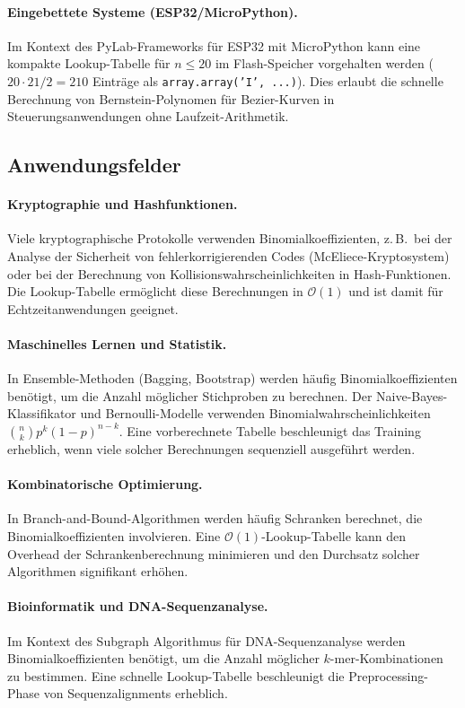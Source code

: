 ﻿\documentclass[12pt, a4paper]{article}
\newcommand{\Oh}{\mathcal{O}}
\theoremstyle{plain}
\theoremstyle{definition}
\theoremstyle{remark}
\renewcommand{\Oh}{\mathcal{O}}
\begin{document}
\paragraph{Eingebettete Systeme (ESP32/MicroPython).}
Im Kontext des PyLab-Frameworks \cite{epp2026pylab} für ESP32 mit
MicroPython kann eine kompakte Lookup-Tabelle für $n \le 20$ im
Flash-Speicher vorgehalten werden ($20 \cdot 21 / 2 = 210$ Einträge
als \texttt{array.array('I', ...)}). Dies erlaubt die schnelle
Berechnung von Bernstein-Polynomen für Bezier-Kurven in
Steuerungsanwendungen ohne Laufzeit-Arithmetik.

\subsection{Anwendungsfelder}

\paragraph{Kryptographie und Hashfunktionen.}
Viele kryptographische Protokolle verwenden Binomialkoeffizienten,
z.\,B.\ bei der Analyse der Sicherheit von fehlerkorrigierenden Codes
(McEliece-Kryptosystem) oder bei der Berechnung von Kollisionswahrscheinlichkeiten
in Hash-Funktionen. Die Lookup-Tabelle ermöglicht diese Berechnungen
in $\Oh(1)$ und ist damit für Echtzeitanwendungen geeignet.

\paragraph{Maschinelles Lernen und Statistik.}
In Ensemble-Methoden (Bagging, Bootstrap) werden häufig
Binomialkoeffizienten benötigt, um die Anzahl möglicher Stichproben
zu berechnen. Der Naive-Bayes-Klassifikator und Bernoulli-Modelle
verwenden Binomialwahrscheinlichkeiten $\binom{n}{k} p^k (1-p)^{n-k}$.
Eine vorberechnete Tabelle beschleunigt das Training erheblich,
wenn viele solcher Berechnungen sequenziell ausgeführt werden.

\paragraph{Kombinatorische Optimierung.}
In Branch-and-Bound-Algorithmen werden häufig Schranken berechnet,
die Binomialkoeffizienten involvieren. Eine $\Oh(1)$-Lookup-Tabelle
kann den Overhead der Schrankenberechnung minimieren und den
Durchsatz solcher Algorithmen signifikant erhöhen.

\paragraph{Bioinformatik und DNA-Sequenzanalyse.}
Im Kontext des Subgraph Algorithmus für DNA-Sequenzanalyse
\cite{epp2026dna} werden Binomialkoeffizienten benötigt, um die
Anzahl möglicher $k$-mer-Kombinationen zu bestimmen. Eine schnelle
Lookup-Tabelle beschleunigt die Preprocessing-Phase von
Sequenzalignments erheblich.
\end{document}
